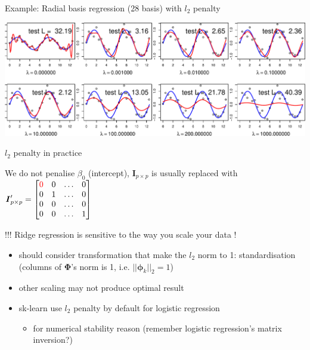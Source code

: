 \documentclass[ignorenonframetext,aspectratio=169]{beamer}
\providecommand{\tightlist}{%
  \setlength{\itemsep}{0pt}\setlength{\parskip}{0pt}}
\newcommand{\vv}[1]{\boldsymbol{#1}}
\begin{document}
\begin{frame}{Example: Radial basis regression (28 basis) with \(l_2\)
penalty}
\protect\hypertarget{example-radial-basis-regression-28-basis-with-l_2-penalty}{}

\begin{center}\includegraphics[width=1\linewidth]{lecture10_files/figure-beamer/unnamed-chunk-21-1} \end{center}

\end{frame}

\begin{frame}{\(l_2\) penalty in practice}
\protect\hypertarget{l_2-penalty-in-practice}{}

We do not penalise \(\beta_0\) (intercept), \(\vv{I}_{p\times p}\) is
usually replaced with
\(\vv{I}_{p\times p}'= \begin{bmatrix}\textcolor{red}{0}& 0&\ldots& 0 \\ 0&1&\ldots& 0 \\ 0&0&\ldots& 0 \\ 0&0&\ldots& 1\end{bmatrix}\)

!!! Ridge regression is sensitive to the way you scale your data !

\begin{itemize}
\tightlist
\item
  should consider transformation that make the \(l_2\) norm to 1:
  standardisation (columns of \(\vv{\Phi}\)'s norm is 1, i.e.
  \(||\vv{\phi}_k||_2=1\))
\item
  other scaling may not produce optimal result
\item
  sk-learn use \(l_2\) penalty by default for logistic regression

  \begin{itemize}
  \tightlist
  \item
    for numerical stability reason (remember logistic regression's
    matrix inversion?)
  \end{itemize}
\end{itemize}

\end{frame}
\end{document}
